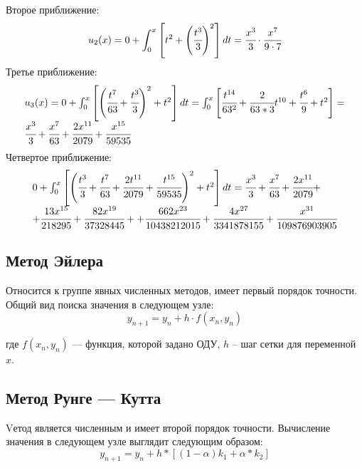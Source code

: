 Второе приближение:
\begin{equation}
	u_2(x) = 0 + \int_{0}^{x}\left[t^2 + \left(\cfrac{t^3}{3}\right)^2\right] dt = \cfrac{x^3}{3} \cdot \cfrac{x^7}{9 \cdot 7}
\end{equation}
%
Третье приближение:
\begin{equation}
	\begin{array}{ll}
	u_3(x) = 0 + \int_{0}^{x}\left[ \left(\cfrac{t^7}{63} + \cfrac{t^3}{3} \right)^2 + t^2 \right] dt = 
	\int_{0}^{x}\left[ \cfrac{t^{14}}{63^2} + \cfrac{2}{63*3}t^{10} + \cfrac{t^6}{9} + t^2 \right] = \\
	\cfrac{x^3}{3} + \cfrac{x^7}{63} + \cfrac{2x^{11}}{2079} + \cfrac{x^{15}}{59535} 
	\end{array}
\end{equation}
%
Четвертое приближение:
\begin{equation}
	\begin{array}{ll}
	0 + \int_{0}^{x}\left[ \left( \cfrac{t^3}{3} + \cfrac{t^7}{63} + \cfrac{2t^{11}}{2079} +  \cfrac{t^{15}}{59535} \right)^2 + t^2 \right] dt = 
	\cfrac{x^3}{3} + \cfrac{x^{7}}{63} + \cfrac{2x^{11}}{2079} + \\+ \cfrac{13x^{15}}{218295} + \cfrac{82x^{19}}{37328445} +
	+ \cfrac{662x^{23}}{10438212015} + \cfrac{4x^{27}}{3341878155} + \cfrac{x^{31}}{109876903905}
	\end{array}
\end{equation}

\subsection{Метод Эйлера}
Относится к группе явных численных методов, имеет первый порядок точности. Общий вид поиска значения в следующем узле:
\begin{equation}
	y_{n + 1} = y_n + h \cdot f(x_n, y_n)
\end{equation}

где $f(x_n, y_n)$ --- функция, которой задано ОДУ, $h$ – шаг сетки для переменной $x$.

\subsection{Метод Рунге --- Кутта}
Vетод является численным и имеет второй порядок
точности. Вычисление значения в следующем узле выглядит следующим
образом:
\begin{equation}
	y_{n+1} = y_n + h*[(1-\alpha)k_1 + \alpha * k_2]
\end{equation}

